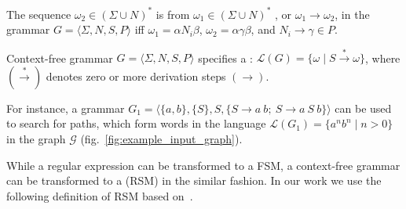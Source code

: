 \begin{definition}
The sequence $\omega_2 \in (\Sigma \cup N)^*$ is  from $\omega_1 \in (\Sigma \cup N)^*$ , or $\omega_1 \to \omega_2$, in the grammar $G = \langle\Sigma, N, S, P\rangle$ iff $\omega_1=\alpha N_i \beta$, $\omega_2 = \alpha \gamma \beta$, and $N_i \to \gamma \in P$.
\end{definition}

\begin{definition}
Context-free grammar $G=\langle\Sigma, N, S, P\rangle$ specifies a : $\mathcal{L}(G) = \{\omega \mid S \xrightarrow{*} \omega \}$, where $(\xrightarrow{*})$ denotes zero or more derivation steps $(\to)$.
\end{definition}

For instance, a grammar $G_1 = \langle \{a,b\}, \{S\}, S, \{S \to a \ b; \ S \to a \ S \ b\} \rangle$ can be used to search for paths, which form words in the language $\mathcal{L}(G_1) = \{a^n b^n \mid n > 0\}$ in the graph $\mathcal{G}$ (fig.~\ref{fig:example_input_graph}).


While a regular expression can be transformed to a FSM, a context-free grammar can be transformed to a  (RSM) in the similar fashion.
In our work we use the following definition of RSM based
on~\cite{rsm:analysis:10.1007/3-540-44585-4_18}.

